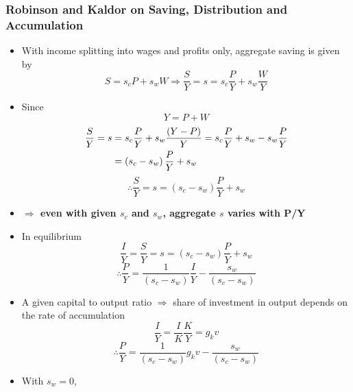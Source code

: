 \documentclass[a4paper,twoside]{article}
\numberwithin{equation}{section}
\numberwithin{figure}{section}
\begin{document}
\subsubsection{Robinson and Kaldor on Saving, Distribution and Accumulation}
	\begin{itemize}
		\item With income splitting into wages and profits only, aggregate saving is given by 
		\begin{equation}
			S = s_c P + s_w W \Rightarrow \frac{S}{Y}=s=s_c \frac{P}{Y}+s_w\frac{W}{Y} \label{E:4.6}
		\end{equation}
		\item Since
		\begin{equation}
			Y = P + W \label{E:4.7}
		\end{equation}
		\begin{align}
			\frac{S}{Y} = s &= s_c \frac{P}{Y} + s_w\frac{(Y-P)}{Y} = s_c \frac{P}{Y} + s_w - s_w\frac{P}{Y} \\\notag
			&= \left( s_c-s_w \right) \frac{P}{Y} + s_w \label{E:4.8}
		\end{align}
		\begin{equation}
			\therefore \frac{S}{Y} = s = \left( s_c - s_w \right) \frac{P}{Y} + s_w \label{E:4.9}
		\end{equation}
		\item \textbf{\( \Rightarrow \) even with given \( s_c \) and \( s_w \), aggregate \( s \) varies with P/Y}
		\item In equilibrium
		\begin{equation}
			\frac{I}{Y} = \frac{S}{Y} = s = \left( s_c - s_w \right) \frac{P}{Y} + s_w \label{E:4.10}
		\end{equation}
		\begin{equation}
			\therefore \frac{P}{Y} = \frac{1}{\left( s_c - s_w \right)}\frac{I}{Y}-\frac{s_w}{\left( s_c - s_w \right)} \label{E:4.11}
		\end{equation}
		\item A given capital to output ratio \( \Rightarrow \) share of investment in output depends on the rate of accumulation
		\begin{equation}
			\frac{I}{Y} = \frac{I}{K}\frac{K}{Y} = g_k v \label{E:4.12}
		\end{equation}
		\begin{equation}
			\therefore \frac{P}{Y} = \frac{1}{\left( s_c - s_w \right)}g_k v - \frac{s_w}{\left( s_c - s_w \right)} \label{E:4.13}
		\end{equation}
		\item With \( s_w = 0 \),

\end{itemize}
\end{document}

